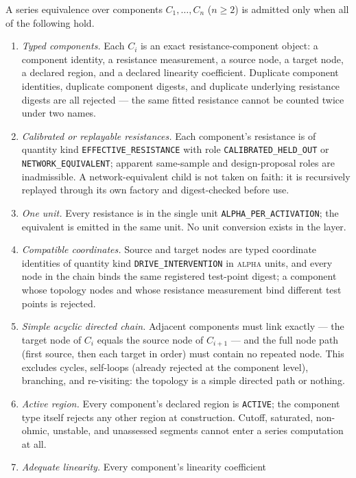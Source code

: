 \begin{ruleenv}\label{ch09:rule:series}
A series equivalence over components $C_1, \ldots, C_n$ ($n \ge 2$) is
admitted only when all of the following hold.
\begin{enumerate}
\item \emph{Typed components.} Each $C_i$ is an exact resistance-component
object: a component identity, a resistance measurement, a source node, a
target node, a declared region, and a declared linearity coefficient.
Duplicate component identities, duplicate component digests, and duplicate
underlying resistance digests are all rejected --- the same fitted
resistance cannot be counted twice under two names.
\item \emph{Calibrated or replayable resistances.} Each component's
resistance is of quantity kind \texttt{EFFECTIVE\_RESISTANCE} with role
\texttt{CALIBRATED\_HELD\_OUT} or \texttt{NETWORK\_EQUIVALENT}; apparent
same-sample and design-proposal roles are inadmissible. A
network-equivalent child is not taken on faith: it is recursively replayed
through its own factory and digest-checked before use.
\item \emph{One unit.} Every resistance is in the single unit
\texttt{ALPHA\_PER\_ACTIVATION}; the equivalent is emitted in the same
unit. No unit conversion exists in the layer.
\item \emph{Compatible coordinates.} Source and target nodes are typed
coordinate identities of quantity kind \texttt{DRIVE\_INTERVENTION} in
\textsc{alpha} units, and every node in the chain binds the same
registered test-point digest; a component whose topology nodes and whose
resistance measurement bind different test points is rejected.
\item \emph{Simple acyclic directed chain.} Adjacent components must link
exactly --- the target node of $C_i$ equals the source node of
$C_{i+1}$ --- and the full node path (first source, then each target in
order) must contain no repeated node. This excludes cycles, self-loops
(already rejected at the component level), branching, and re-visiting: the
topology is a simple directed path or nothing.
\item \emph{Active region.} Every component's declared region is
\texttt{ACTIVE}; the component type itself rejects any other region at
construction. Cutoff, saturated, non-ohmic, unstable, and unassessed
segments cannot enter a series computation at all.
\item \emph{Adequate linearity.} Every component's linearity coefficient

\end{enumerate}
\end{ruleenv}
